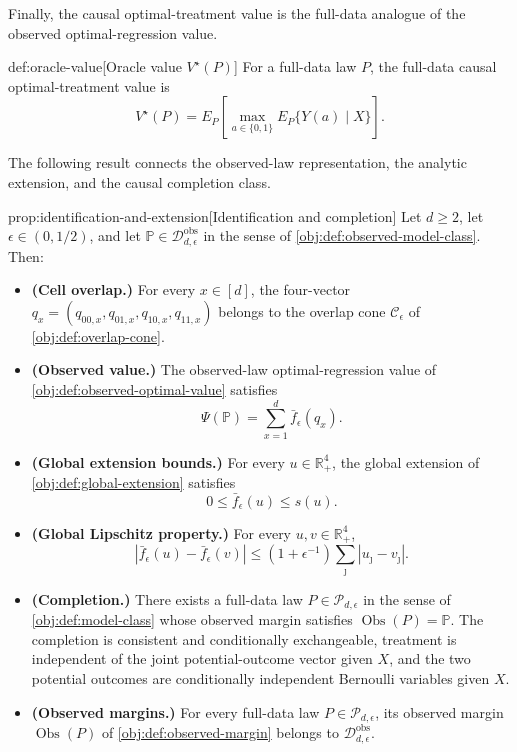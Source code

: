 Finally, the causal optimal-treatment value is the full-data analogue of the observed optimal-regression value.

\begin{definitionv}{def:oracle-value}[Oracle value \(V^\star(P)\)]
For a full-data law \(P\), the full-data causal optimal-treatment value is
\[
V^\star(P)
=
E_P\!\left[
\max_{a\in\{0,1\}}
E_P\{Y(a)\mid X\}
\right].
\]
\end{definitionv}

The following result connects the observed-law representation, the analytic extension, and the causal completion class.

\begin{propositionv}{prop:identification-and-extension}[Identification and completion]
Let \(d\ge 2\), let \(\epsilon\in(0,1/2)\), and let \(\mathbb P\in\mathcal D_{d,\epsilon}^{\mathrm{obs}}\) in the sense of \cref{obj:def:observed-model-class}. Then:
\begin{itemize}
\item \textbf{(Cell overlap.)} For every \(x\in[d]\), the four-vector \(q_x=(q_{00,x},q_{01,x},q_{10,x},q_{11,x})\) belongs to the overlap cone \(\mathcal C_\epsilon\) of \cref{obj:def:overlap-cone}.
\item \textbf{(Observed value.)} The observed-law optimal-regression value of \cref{obj:def:observed-optimal-value} satisfies
\[
\Psi(\mathbb P)=\sum_{x=1}^d \bar f_\epsilon(q_x).
\]
\item \textbf{(Global extension bounds.)} For every \(u\in\mathbb R_+^4\), the global extension of \cref{obj:def:global-extension} satisfies
\[
0\le \bar f_\epsilon(u)\le s(u).
\]
\item \textbf{(Global Lipschitz property.)} For every \(u,v\in\mathbb R_+^4\),
\[
\left|\bar f_\epsilon(u)-\bar f_\epsilon(v)\right|
\le (1+\epsilon^{-1})\sum_{\jmath}\left|u_{\jmath}-v_{\jmath}\right|.
\]
\item \textbf{(Completion.)} There exists a full-data law \(P\in\mathcal P_{d,\epsilon}\) in the sense of \cref{obj:def:model-class} whose observed margin satisfies \(\operatorname{Obs}(P)=\mathbb P\). The completion is consistent and conditionally exchangeable, treatment is independent of the joint potential-outcome vector given \(X\), and the two potential outcomes are conditionally independent Bernoulli variables given \(X\).
\item \textbf{(Observed margins.)} For every full-data law \(P\in\mathcal P_{d,\epsilon}\), its observed margin \(\operatorname{Obs}(P)\) of \cref{obj:def:observed-margin} belongs to \(\mathcal D_{d,\epsilon}^{\mathrm{obs}}\).
\end{itemize}
\end{propositionv}

